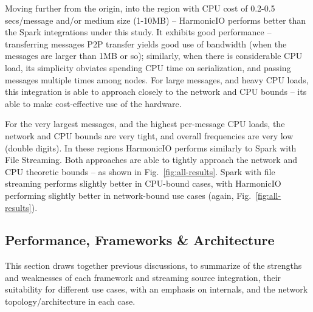 \documentclass[conference]{IEEEtran}
\begin{document}

Moving further from the origin, into the region with CPU cost of 0.2-0.5 secs/message and/or medium size (1-10MB) -- HarmonicIO performs better than the Spark integrations under this study. 
It exhibits good performance -- transferring messages P2P transfer yields good use of bandwidth (when the messages are larger than 1MB or so); 
similarly, when there is considerable CPU load, its simplicity obviates spending CPU time on serialization, and passing messages multiple times among nodes. %
For large messages, and heavy CPU loads, this integration is able to approach closely to the network and CPU bounds -- its able to make cost-effective use of the hardware.

For the very largest messages, and the highest per-message CPU loads, the network and CPU bounds are very tight, and overall frequencies are very low (double digits). In these regions HarmonicIO performs similarly to Spark with File Streaming. Both approaches are able to tightly approach the network and CPU theoretic bounds -- as shown in Fig.~\ref{fig:all-results}. Spark with file streaming performs slightly better in CPU-bound cases, with HarmonicIO performing slightly better in network-bound use cases (again, Fig.~\ref{fig:all-results}). 

\subsection{Performance, Frameworks \& Architecture}

This section draws together previous discussions, to summarize of the strengths and weaknesses of each framework and streaming source integration, their suitability for different use cases, with an emphasis on internals, and the network topology/architecture in each case. 
\end{document}
